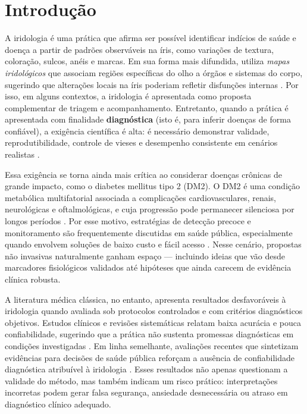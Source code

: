 \documentclass[11pt,a4paper]{article}
\begin{document}
\section{Introdução}
A iridologia é uma prática que afirma ser possível identificar indícios de saúde e doença a partir de padrões observáveis na íris, como variações de textura, coloração, sulcos, anéis e marcas. Em sua forma mais difundida, utiliza \textit{mapas iridológicos} que associam regiões específicas do olho a órgãos e sistemas do corpo, sugerindo que alterações locais na íris poderiam refletir disfunções internas \citep{Ernst2000ArchOphthalmol}. Por isso, em alguns contextos, a iridologia é apresentada como proposta complementar de triagem e acompanhamento. Entretanto, quando a prática é apresentada com finalidade \textbf{diagnóstica} (isto é, para inferir doenças de forma confiável), a exigência científica é alta: é necessário demonstrar validade, reprodutibilidade, controle de vieses e desempenho consistente em cenários realistas \citep{AusGovIridology2025}.

Essa exigência se torna ainda mais crítica ao considerar doenças crônicas de grande impacto, como o diabetes mellitus tipo 2 (DM2). O DM2 é uma condição metabólica multifatorial associada a complicações cardiovasculares, renais, neurológicas e oftalmológicas, e cuja progressão pode permanecer silenciosa por longos períodos \citep{WHOdiabetes2024}. Por esse motivo, estratégias de detecção precoce e monitoramento são frequentemente discutidas em saúde pública, especialmente quando envolvem soluções de baixo custo e fácil acesso \citep{WHOdiabetes2024}. Nesse cenário, propostas não invasivas naturalmente ganham espaço --- incluindo ideias que vão desde marcadores fisiológicos validados até hipóteses que ainda carecem de evidência clínica robusta.

A literatura médica clássica, no entanto, apresenta resultados desfavoráveis à iridologia quando avaliada sob protocolos controlados e com critérios diagnósticos objetivos. Estudos clínicos e revisões sistemáticas relatam baixa acurácia e pouca confiabilidade, sugerindo que a prática não sustenta promessas diagnósticas em condições investigadas \citep{Simon1979JAMA, Knipschild1988BMJ, Ernst2000ArchOphthalmol}. Em linha semelhante, avaliações recentes que sintetizam evidências para decisões de saúde pública reforçam a ausência de confiabilidade diagnóstica atribuível à iridologia \citep{AusGovIridology2025}. Esses resultados não apenas questionam a validade do método, mas também indicam um risco prático: interpretações incorretas podem gerar falsa segurança, ansiedade desnecessária ou atraso em diagnóstico clínico adequado.
\end{document}
